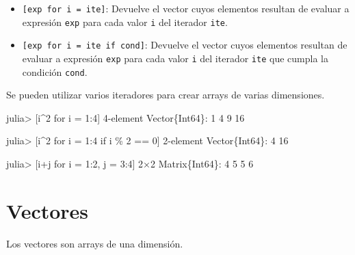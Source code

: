 \documentclass[
  letterpaper,
  DIV=11,
  numbers=noendperiod]{scrreprt}
\newenvironment{Shaded}{\begin{snugshade}}{\end{snugshade}}
\newcommand{\DataTypeTok}[1]{\textcolor[rgb]{0.68,0.00,0.00}{#1}}
\newcommand{\FloatTok}[1]{\textcolor[rgb]{0.68,0.00,0.00}{#1}}
\newcommand{\NormalTok}[1]{\textcolor[rgb]{0.00,0.23,0.31}{#1}}
\newcommand{\OperatorTok}[1]{\textcolor[rgb]{0.37,0.37,0.37}{#1}}
\begin{document}
\begin{itemize}
\item
  \texttt{{[}exp\ for\ i\ =\ ite{]}}: Devuelve el vector cuyos elementos
  resultan de evaluar a expresión \texttt{exp} para cada valor
  \texttt{i} del iterador \texttt{ite}.
\item
  \texttt{{[}exp\ for\ i\ =\ ite\ if\ cond{]}}: Devuelve el vector cuyos
  elementos resultan de evaluar a expresión \texttt{exp} para cada valor
  \texttt{i} del iterador \texttt{ite} que cumpla la condición
  \texttt{cond}.
\end{itemize}

Se pueden utilizar varios iteradores para crear arrays de varias
dimensiones.

\begin{Shaded}
\begin{Highlighting}[]
\NormalTok{julia}\OperatorTok{\textgreater{}}\NormalTok{ [i}\OperatorTok{\^{}}\FloatTok{2}\NormalTok{ for i }\OperatorTok{=} \FloatTok{1}\OperatorTok{:}\FloatTok{4}\NormalTok{]}
\FloatTok{4}\OperatorTok{{-}}\NormalTok{element }\DataTypeTok{Vector}\NormalTok{\{}\DataTypeTok{Int64}\NormalTok{\}}\OperatorTok{:}
  \FloatTok{1}
  \FloatTok{4}
  \FloatTok{9}
 \FloatTok{16}

\NormalTok{julia}\OperatorTok{\textgreater{}}\NormalTok{ [i}\OperatorTok{\^{}}\FloatTok{2}\NormalTok{ for i }\OperatorTok{=} \FloatTok{1}\OperatorTok{:}\FloatTok{4}\NormalTok{ if i }\OperatorTok{\%} \FloatTok{2} \OperatorTok{==} \FloatTok{0}\NormalTok{]}
\FloatTok{2}\OperatorTok{{-}}\NormalTok{element }\DataTypeTok{Vector}\NormalTok{\{}\DataTypeTok{Int64}\NormalTok{\}}\OperatorTok{:}
  \FloatTok{4}
 \FloatTok{16}

\NormalTok{julia}\OperatorTok{\textgreater{}}\NormalTok{ [i}\OperatorTok{+}\NormalTok{j for i }\OperatorTok{=} \FloatTok{1}\OperatorTok{:}\FloatTok{2}\NormalTok{, j }\OperatorTok{=} \FloatTok{3}\OperatorTok{:}\FloatTok{4}\NormalTok{]}
\FloatTok{2}\OperatorTok{×}\FloatTok{2} \DataTypeTok{Matrix}\NormalTok{\{}\DataTypeTok{Int64}\NormalTok{\}}\OperatorTok{:}
 \FloatTok{4}  \FloatTok{5}
 \FloatTok{5}  \FloatTok{6}
\end{Highlighting}
\end{Shaded}

\hypertarget{vectores}{%
\section{Vectores}\label{vectores}}

Los vectores son arrays de una dimensión.
\end{document}
